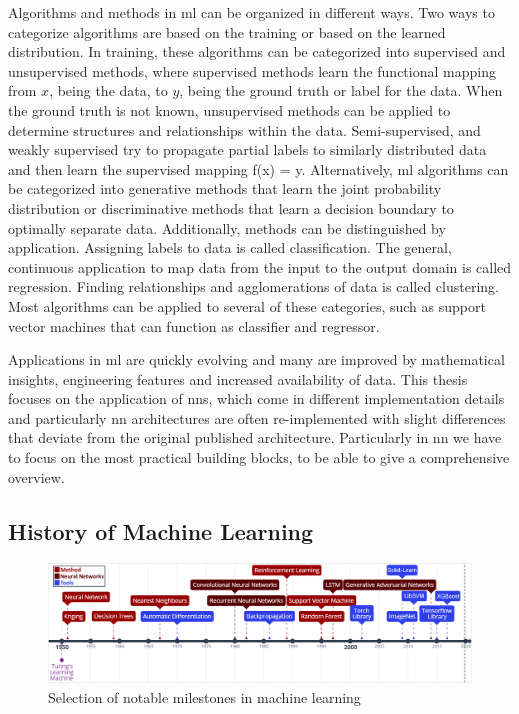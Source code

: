 Algorithms and methods in \ac{ml} can be organized in different ways. Two ways to categorize algorithms are based on the training or based on the learned distribution. In training, these algorithms can be categorized into supervised and unsupervised methods, where supervised methods learn the functional mapping from $x$, being the data, to $y$, being the ground truth or label for the data. When the ground truth is not known, unsupervised methods can be applied to determine structures and relationships within the data. Semi-supervised, and weakly supervised try to propagate partial labels to similarly distributed data and then learn the supervised mapping f(x) = y. Alternatively, \ac{ml} algorithms can be categorized into generative methods that learn the joint probability distribution or discriminative methods that learn a decision boundary to optimally separate data. Additionally, methods can be distinguished by application. Assigning labels to data is called classification. The general, continuous application to map data from the input to the output domain is called regression. Finding relationships and agglomerations of data is called clustering. Most algorithms can be applied to several of these categories, such as support vector machines that can function as classifier and regressor. 

Applications in \ac{ml} are quickly evolving and many are improved by mathematical insights, engineering features and increased availability of data. This thesis focuses on the application of \acp{nn}, which come in different implementation details and particularly \ac{nn} architectures are often re-implemented with slight differences that deviate from the original published architecture. Particularly in \ac{nn} we have to focus on the most practical building blocks, to be able to give a comprehensive overview.

\subsection{History of Machine Learning}

\begin{figure}[H]
    \centering
    \hspace*{-1.5cm}
    \includegraphics[width=1.15\textwidth]{figures/ML-Timeline.png}
    \caption{Selection of notable milestones in machine learning}
    \label{fig:mltimeline}
\end{figure}

